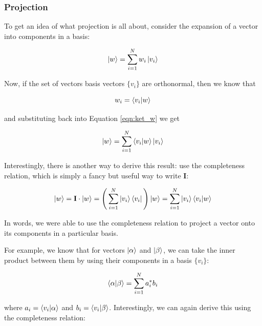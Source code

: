 \documentclass[11pt, oneside]{article}   	%
\begin{document}
\subsubsection{Projection}
To get an idea of what projection is all about, consider the expansion of a vector into components in a basis:

\begin{equation}
\ket{w} =  \sum\limits_{i = 1}^{N} w_i \ket{v_i}
\label{eqn:ket_w}
\end{equation}

\bigskip
\noindent
Now, if the set of vectors basis vectors  $\{v_i\}$ are orthonormal, then we know that 

\begin{equation*}
w_i  =  \braket{v_i  | w}
\end{equation*}

\bigskip
\noindent
and substituting back into Equation \ref{eqn:ket_w} we get

\begin{equation*}
\ket{w} =  \sum\limits_{i = 1}^{N}  \braket{v_i  | w} \ket{v_i}
\end{equation*}

\bigskip
\noindent
Interestingly, there is another way to derive this result:  use the completeness relation, which is simply a fancy but useful way to write \textbf{I}:

\begin{equation*}
\ket{w} =  \mathbf{I} \cdot \ket{w} =  \Bigg (\sum\limits_{i = 1}^{N}  \ket{v_i} \bra{v_i} \Bigg ) \ket{w} = \sum\limits_{i = 1}^{N}  \ket{v_i} \braket{v_i | w}
\end{equation*} 

\bigskip
\noindent
In words, we were able to use the completeness relation to project a vector onto its components in a particular basis.

\bigskip
\noindent
For example, we know that for vectors $\ket{\alpha}$ and $\ket{\beta}$, we can take the inner product between them by using their components in a basis $\{v_i\}$:

\bigskip
\begin{equation*}
\braket{\alpha  | \beta} = \sum\limits_{i = 1}^{N} a_i^* b_i
\end{equation*} 

\bigskip
\noindent
where $a_i = \braket{v_i | \alpha}$ and $b_i = \braket{v_i | \beta}$. Interestingly, we can again derive this using the completeness relation:
\end{document}
